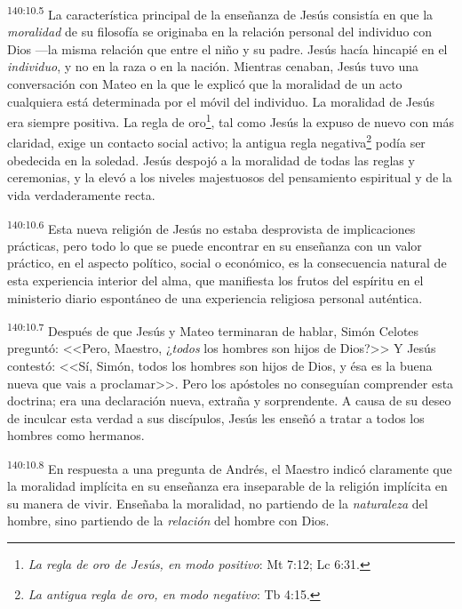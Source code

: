 \par 
\textsuperscript{140:10.5} La característica principal de la enseñanza de Jesús consistía en que la \textit{moralidad} de su filosofía se originaba en la relación personal del individuo con Dios ---la misma relación que entre el niño y su padre. Jesús hacía hincapié en el \textit{individuo}, y no en la raza o en la nación. Mientras cenaban, Jesús tuvo una conversación con Mateo en la que le explicó que la moralidad de un acto cualquiera está determinada por el móvil del individuo. La moralidad de Jesús era siempre positiva. La regla de oro\footnote{\textit{La regla de oro de Jesús, en modo positivo}: Mt 7:12; Lc 6:31.}, tal como Jesús la expuso de nuevo con más claridad, exige un contacto social activo; la antigua regla negativa\footnote{\textit{La antigua regla de oro, en modo negativo}: Tb 4:15.} podía ser obedecida en la soledad. Jesús despojó a la moralidad de todas las reglas y ceremonias, y la elevó a los niveles majestuosos del pensamiento espiritual y de la vida verdaderamente recta.

\par 
\textsuperscript{140:10.6} Esta nueva religión de Jesús no estaba desprovista de implicaciones prácticas, pero todo lo que se puede encontrar en su enseñanza con un valor práctico, en el aspecto político, social o económico, es la consecuencia natural de esta experiencia interior del alma, que manifiesta los frutos del espíritu en el ministerio diario espontáneo de una experiencia religiosa personal auténtica.

\par 
\textsuperscript{140:10.7} Después de que Jesús y Mateo terminaran de hablar, Simón Celotes preguntó: <<Pero, Maestro, ¿\textit{todos} los hombres son hijos de Dios?>> Y Jesús contestó: <<Sí, Simón, todos los hombres son hijos de Dios, y ésa es la buena nueva que vais a proclamar>>. Pero los apóstoles no conseguían comprender esta doctrina; era una declaración nueva, extraña y sorprendente. A causa de su deseo de inculcar esta verdad a sus discípulos, Jesús les enseñó a tratar a todos los hombres como hermanos.

\par 
\textsuperscript{140:10.8} En respuesta a una pregunta de Andrés, el Maestro indicó claramente que la moralidad implícita en su enseñanza era inseparable de la religión implícita en su manera de vivir. Enseñaba la moralidad, no partiendo de la \textit{naturaleza} del hombre, sino partiendo de la \textit{relación} del hombre con Dios.

